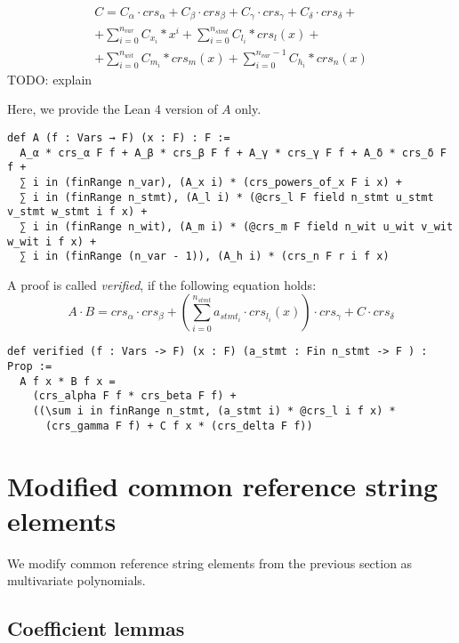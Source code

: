 \documentclass{article}
\theoremstyle{definition}
\theoremstyle{remark}
\begin{document}
\begin{multline}
C = C_{\alpha} \cdot crs_{\alpha} + C_{\beta} \cdot crs_{\beta} + C_{\gamma} \cdot crs_{\gamma} + C_{\delta} \cdot crs_{\delta} + \\
    + \sum \limits_{i = 0}^{n_{var}} C_{x_i} * x^i + \sum \limits_{i = 0}^{n_{stmt}} C_{l_i} * crs_l(x) + \\
    + \sum \limits_{i = 0}^{n_{wit}} C_{m_i} * crs_m(x) + \sum \limits_{i = 0}^{n_{var} - 1} C_{h_i} * crs_n(x)
\end{multline}
TODO: explain

Here, we provide the Lean 4 version of $A$ only.

\begin{lstlisting}
def A (f : Vars → F) (x : F) : F :=
  A_α * crs_α F f + A_β * crs_β F f + A_γ * crs_γ F f + A_δ * crs_δ F f +
  ∑ i in (finRange n_var), (A_x i) * (crs_powers_of_x F i x) +
  ∑ i in (finRange n_stmt), (A_l i) * (@crs_l F field n_stmt u_stmt v_stmt w_stmt i f x) +
  ∑ i in (finRange n_wit), (A_m i) * (@crs_m F field n_wit u_wit v_wit w_wit i f x) +
  ∑ i in (finRange (n_var - 1)), (A_h i) * (crs_n F r i f x)
\end{lstlisting}

A proof is called \emph{verified}, if the following equation holds:
\begin{equation}
A \cdot B = crs_{\alpha} \cdot crs_{\beta} + \left(\sum \limits_{i = 0}^{n_{stmt}} a_{{stmt}_i} \cdot crs_{l_i}(x) \right) \cdot crs_{\gamma} + C \cdot crs_{\delta}
\end{equation}

\begin{lstlisting}
def verified (f : Vars -> F) (x : F) (a_stmt : Fin n_stmt -> F ) : Prop :=
  A f x * B f x =
    (crs_alpha F f * crs_beta F f) +
    ((\sum i in finRange n_stmt, (a_stmt i) * @crs_l i f x) *
      (crs_gamma F f) + C f x * (crs_delta F f))
\end{lstlisting}

\section{Modified common reference string elements}

We modify common reference string elements from the previous section as multivariate polynomials.

\subsection{Coefficient lemmas}
\end{document}
